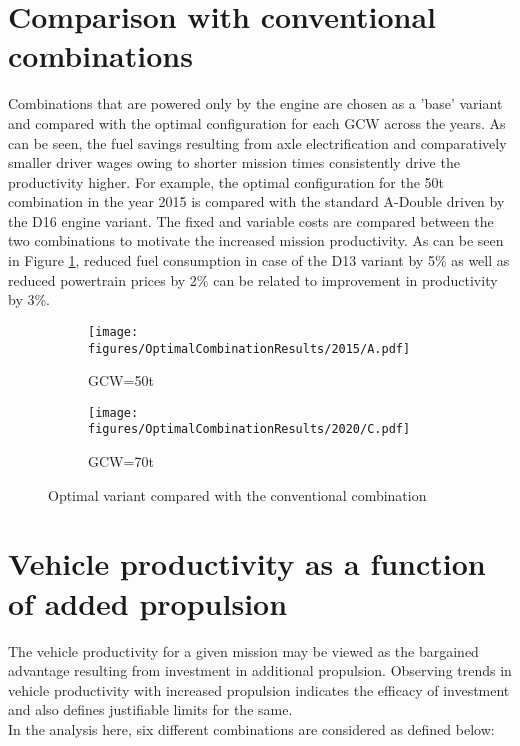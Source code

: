 \documentclass[ExampleMasters.tex]{subfiles}
\begin{document}
\section{Comparison with conventional combinations}
	Combinations that are powered only by the engine are chosen as a 'base' variant and compared with the optimal configuration for each GCW across the years. As can be seen, the fuel savings resulting from axle electrification and comparatively smaller driver wages owing to shorter mission times consistently drive the productivity higher. For example, the optimal configuration for the 50t combination in the year 2015 is compared with the standard A-Double driven by the D16 engine variant. The fixed and variable costs are compared between the two combinations to motivate the increased mission productivity. As can be seen in Figure \ref{2015AC0vsAC1}, reduced fuel consumption in case of the D13 variant by 5\% as well as reduced powertrain prices by 2\% can be related to improvement in productivity by 3\%.\\

	\begin{figure}[H]
		\begin{subfigure}{0.5\textwidth}
			\centering
			\texttt{[image: figures/OptimalCombinationResults/2015/A.pdf]}
			\caption{GCW=50t}
		\end{subfigure}
		\begin{subfigure}{.5\textwidth}
			\centering
			\texttt{[image: figures/OptimalCombinationResults/2020/C.pdf]}
			\caption{GCW=70t}
		\end{subfigure}
		\caption{Optimal variant compared with the conventional combination}
		\label{2015AC0vsAC1}
	\end{figure}

\section{Vehicle productivity as a function of added propulsion}
	The vehicle productivity for a given mission may be viewed as the bargained advantage resulting from investment in additional propulsion. Observing trends in vehicle productivity with increased propulsion indicates the efficacy of investment and also defines justifiable limits for the same.\\

	In the analysis here, six different combinations are considered as defined below:\\
\end{document}
